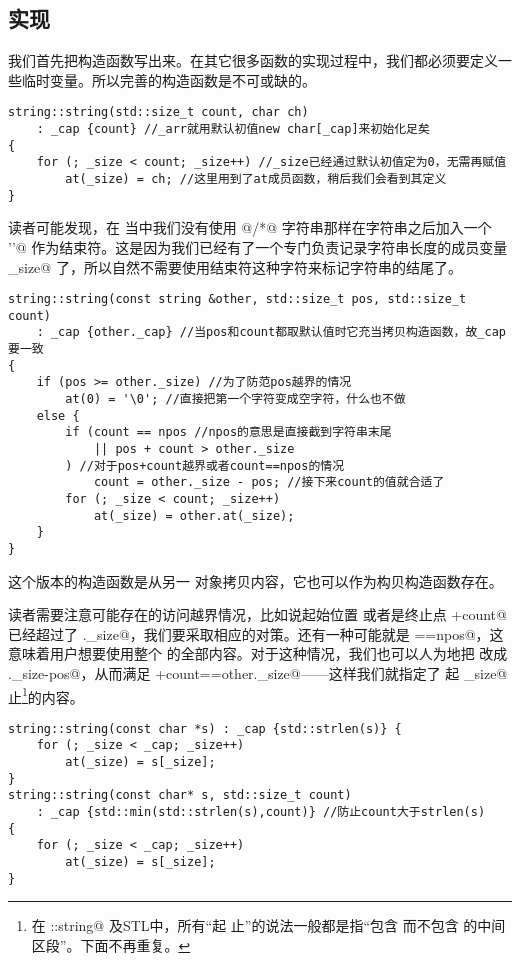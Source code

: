 \subsection*{实现}
我们首先把构造函数写出来。在其它很多函数的实现过程中，我们都必须要定义一些临时变量。所以完善的构造函数是不可或缺的。\par
\begin{lstlisting}
string::string(std::size_t count, char ch)
    : _cap {count} //_arr就用默认初值new char[_cap]来初始化足矣
{
    for (; _size < count; _size++) //_size已经通过默认初值定为0，无需再赋值
        at(_size) = ch; //这里用到了at成员函数，稍后我们会看到其定义
}
\end{lstlisting}
读者可能发现，在 \lstinline@string@ 当中我们没有使用 \lstinline@char[]@/\lstinline@char*@ 字符串那样在字符串之后加入一个 \lstinline@'\0'@ 作为结束符。这是因为我们已经有了一个专门负责记录字符串长度的成员变量 \lstinline@_size@ 了，所以自然不需要使用结束符这种字符来标记字符串的结尾了。
\begin{lstlisting}
string::string(const string &other, std::size_t pos, std::size_t count)
    : _cap {other._cap} //当pos和count都取默认值时它充当拷贝构造函数，故_cap要一致
{
    if (pos >= other._size) //为了防范pos越界的情况
        at(0) = '\0'; //直接把第一个字符变成空字符，什么也不做
    else {
        if (count == npos //npos的意思是直接截到字符串末尾
            || pos + count > other._size
        ) //对于pos+count越界或者count==npos的情况
            count = other._size - pos; //接下来count的值就合适了
        for (; _size < count; _size++)
            at(_size) = other.at(_size);
    }
}
\end{lstlisting}
这个版本的构造函数是从另一 \lstinline@string@ 对象拷贝内容，它也可以作为构贝构造函数存在。\par
读者需要注意可能存在的访问越界情况，比如说起始位置 \lstinline@pos@ 或者是终止点 \lstinline@pos+count@ 已经超过了 \lstinline@other._size@，我们要采取相应的对策。还有一种可能就是 \lstinline@count==npos@，这意味着用户想要使用整个 \lstinline@string@ 的全部内容。对于这种情况，我们也可以人为地把 \lstinline@count@ 改成 \lstinline@other._size-pos@，从而满足 \lstinline@pos+count==other._size@——这样我们就指定了 \lstinline@pos@ 起 \lstinline@_size@ 止\footnote{在 \lstinline@std::string@ 及STL中，所有``\lstinline@a@ 起 \lstinline@b@ 止''的说法一般都是指``包含 \lstinline@a@ 而不包含 \lstinline@b@ 的中间区段''。下面不再重复。}的内容。
\begin{lstlisting}
string::string(const char *s) : _cap {std::strlen(s)} {
    for (; _size < _cap; _size++)
        at(_size) = s[_size];
}
string::string(const char* s, std::size_t count)
    : _cap {std::min(std::strlen(s),count)} //防止count大于strlen(s)
{
    for (; _size < _cap; _size++)
        at(_size) = s[_size];
}
\end{lstlisting}
